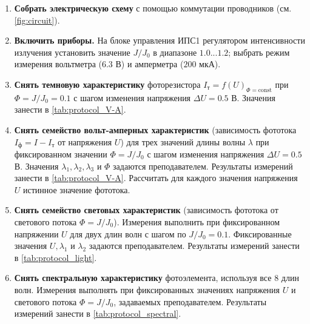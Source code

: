 \begin{enumerate}
    \item \textbf{Собрать электрическую схему} с помощью коммутации проводников (см. \cref{fig:circuit}).

    \item \textbf{Включить приборы.} На блоке управления ИПС1 регулятором интенсивности излучения установить значение $J/J_0$ в диапазоне $1.0...1.2$; выбрать режим измерения вольтметра ($6.3$ В) и амперметра ($200$ мкА).

    \item \textbf{Снять темновую характеристику} фоторезистора $I_\text{т} = f(U)_{\Phi=\text{const}}$ при $\Phi = J/J_0 = 0.1$ с шагом изменения напряжения $\Delta U = 0.5$ В. Значения занести в \cref{tab:protocol_V-A}.

    \item \textbf{Снять семейство вольт-амперных характеристик} (зависимость фототока $I_\text{ф} = I - I_\text{т}$ от напряжения $U$) для трех значений длины волны $\lambda$ при фиксированном значении $\Phi = J/J_0$ с шагом изменения напряжения $\Delta U = 0.5$ В. Значения $\lambda_1, \lambda_2, \lambda_3$ и $\Phi$ задаются преподавателем. Результаты измерений занести в \cref{tab:protocol_V-A}. Рассчитать для каждого значения напряжения $U$ истинное значение фототока.

    \item \textbf{Снять семейство световых характеристик} (зависимость фототока от светового потока $\Phi = J/J_0$). Измерения выполнить при фиксированном напряжении $U$ для двух длин волн с шагом по $J/J_0 = 0.1$. Фиксированные значения $U, \lambda_1$ и $\lambda_2$ задаются преподавателем. Результаты измерений занести в \cref{tab:protocol_light}.

    \item \textbf{Снять спектральную характеристику} фотоэлемента, используя все 8 длин волн. Измерения выполнять при фиксированных значениях напряжения $U$ и светового потока $\Phi = J/J_0$, задаваемых преподавателем. Результаты измерений занести в \cref{tab:protocol_spectral}.
\end{enumerate}

\newpage
\thispagestyle{empty}

